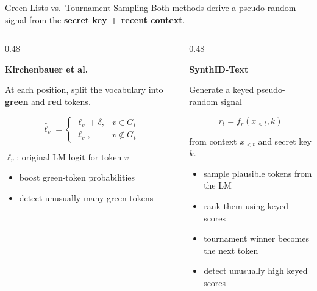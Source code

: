 \documentclass[11pt,compress,t,notes=noshow, xcolor=table]{beamer}
\begin{document}
\begin{vbframe}{Green Lists vs.\ Tournament Sampling}
\small
Both methods derive a pseudo-random signal from the
\textbf{secret key + recent context}.

\begin{columns}[T]

\begin{column}{0.48\textwidth}

\textbf{Kirchenbauer et al.}

At each position, split the vocabulary into
\textbf{green} and \textbf{red} tokens.

\[
\hat{\ell}_v =
\begin{cases}
\ell_v+\delta, & v\in G_t\\
\ell_v, & v\notin G_t
\end{cases}
\]

\(\ell_v\): original LM logit for token \(v\)

\begin{itemize}
  \item boost green-token probabilities
  \item detect unusually many green tokens
\end{itemize}

\end{column}

\begin{column}{0.48\textwidth}

\textbf{SynthID-Text}

Generate a keyed pseudo-random signal

\[
r_t=f_r(x_{<t},k)
\]

from context \(x_{<t}\) and secret key \(k\).

\begin{itemize}
  \item sample plausible tokens from the LM
  \item rank them using keyed scores
  \item tournament winner becomes the next token
  \item detect unusually high keyed scores
\end{itemize}

\end{column}

\end{columns}

\end{vbframe}
\end{document}
